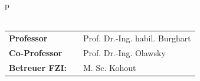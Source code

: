 \begin{center}
\begin{tabular}{p{\textwidth}}
\\

\\

\begin{center}
\begin{tabular}{lll}
\textbf{Professor} & & Prof. Dr.-Ing. habil. Burghart\\
\textbf{Co-Professor} & & Prof. Dr.-Ing. Olawsky\\
\textbf{Betreuer FZI:} & & M. Sc. Kohout\\
\end{tabular}
\end{center}

\end{tabular}
\end{center}